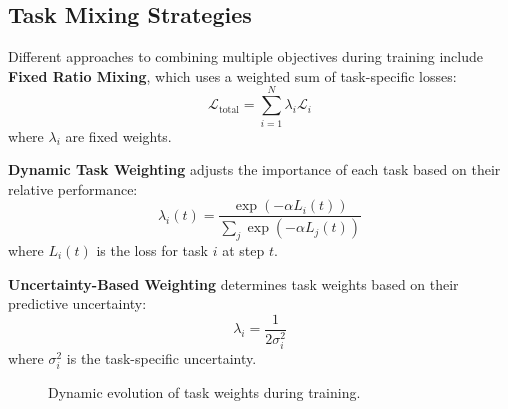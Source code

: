 \subsection{Task Mixing Strategies}
\noindent
Different approaches to combining multiple objectives during training include \textbf{Fixed Ratio Mixing}, which uses a weighted sum of task-specific losses:
\begin{equation}
    \mathcal{L}_\text{total} = \sum_{i=1}^{N} \lambda_i \mathcal{L}_i
\end{equation}
where $\lambda_i$ are fixed weights.

\textbf{Dynamic Task Weighting} adjusts the importance of each task based on their relative performance:
\begin{equation}
    \lambda_i(t) = \frac{\exp(-\alpha L_i(t))}{\sum_j \exp(-\alpha L_j(t))}
\end{equation}
where $L_i(t)$ is the loss for task $i$ at step $t$.

\textbf{Uncertainty-Based Weighting} determines task weights based on their predictive uncertainty:
\begin{equation}
    \lambda_i = \frac{1}{2\sigma_i^2}
\end{equation}
where $\sigma_i^2$ is the task-specific uncertainty.


\begin{figure}[ht]
    \centering
    \caption{Dynamic evolution of task weights during training.}
    \label{fig:task_weights}
\end{figure}

